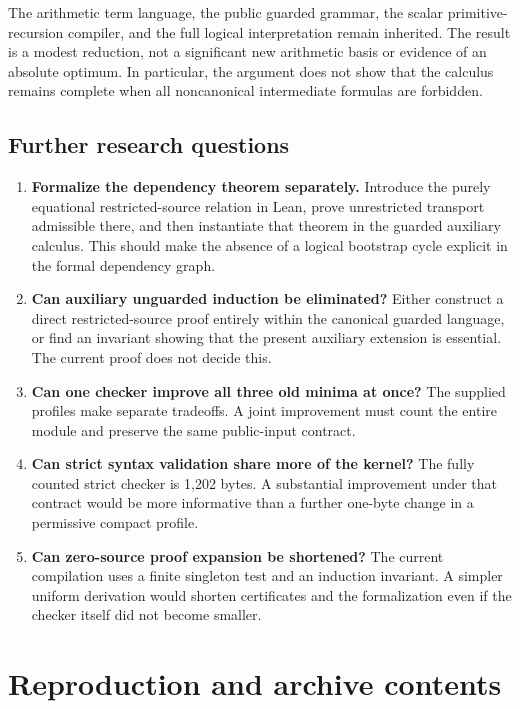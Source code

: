 \documentclass[11pt,letterpaper]{article}
\theoremstyle{definition}
\begin{document}
The arithmetic term language, the public guarded grammar, the scalar
primitive-recursion compiler, and the full logical interpretation remain
inherited. The result is a modest reduction, not a significant new
arithmetic basis or evidence of an absolute optimum. In particular, the
argument does not show that the calculus remains complete when all
noncanonical intermediate formulas are forbidden.

\subsection*{Further research questions}

\begin{enumerate}
\item \textbf{Formalize the dependency theorem separately.} Introduce the
purely equational restricted-source relation in Lean, prove unrestricted
transport admissible there, and then instantiate that theorem in the
guarded auxiliary calculus. This should make the absence of a logical
bootstrap cycle explicit in the formal dependency graph.
\item \textbf{Can auxiliary unguarded induction be eliminated?} Either
construct a direct restricted-source proof entirely within the canonical
guarded language, or find an invariant showing that the present auxiliary
extension is essential. The current proof does not decide this.
\item \textbf{Can one checker improve all three old minima at once?}
The supplied profiles make separate tradeoffs. A joint improvement must
count the entire module and preserve the same public-input contract.
\item \textbf{Can strict syntax validation share more of the kernel?}
The fully counted strict checker is 1,202 bytes. A substantial improvement
under that contract would be more informative than a further one-byte
change in a permissive compact profile.
\item \textbf{Can zero-source proof expansion be shortened?}
The current compilation uses a finite singleton test and an induction
invariant. A simpler uniform derivation would shorten certificates and
the formalization even if the checker itself did not become smaller.
\end{enumerate}

\clearpage
\appendix
\section{Reproduction and archive contents}
\end{document}
